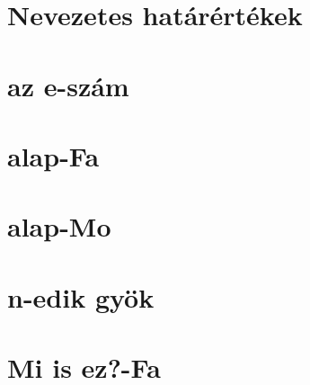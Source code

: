 








\begin{spacing}{1.2}

\section*{Nevezetes határértékek} \label{DB}
\newline
{}
\newpage
\section*{az e-szám} \label{DBe}
\vspace{0.5cm}
\newpage
\section*{alap-Fa} \label{DBe1}
\Fa{

}
\vspace{0.5cm}
\newpage
\section*{alap-Mo} \label{DBe1Mo}
\Mo{

}
\vspace{0.5cm}
\newpage
\section*{n-edik gyök} \label{DBnthroot}
\newline
{}
\newline
{}
\newline
{}
\newline
{}
\vspace{0.5cm}
\newpage
\section*{Mi is ez?-Fa} \label{DBnthrootSum}
\Fa{

}
\vspace{0.5cm}
\newpage

\end{spacing}
